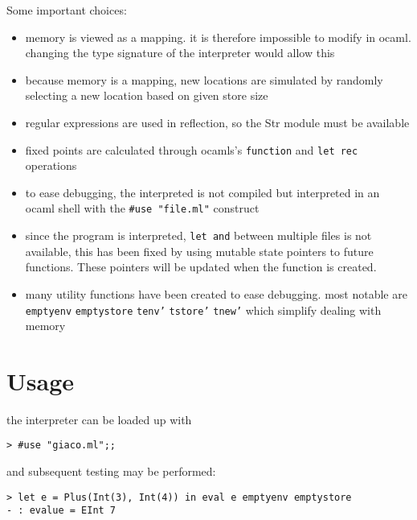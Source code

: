\documentclass[11pt]{report}
\begin{document}
Some important choices:
\begin{itemize}
\item memory is viewed as a mapping. it is therefore impossible to modify in ocaml. changing the type signature of the interpreter would allow this
\item because memory is a mapping, new locations are simulated by randomly selecting a new location based on given store size
\item regular expressions are used in reflection, so the Str module must be available
\item fixed points are calculated through ocamls's \texttt{function} and \texttt{let rec} operations
\item to ease debugging, the interpreted is not compiled but interpreted in an ocaml shell with the \texttt{\#use "file.ml"} construct
\item since the program is interpreted, \texttt{let and} between multiple files is not available, this has been fixed by using mutable state pointers to future functions. These pointers will be updated
when the function is created.
\item many utility functions have been created to ease debugging. most notable are \texttt{emptyenv} \texttt{emptystore} \texttt{tenv'} \texttt{tstore'} \texttt{tnew'} which simplify dealing with memory
\end{itemize}
\part{Usage}
\label{sec:org9296b6f}
the interpreter can be loaded up with
\begin{verbatim}
> #use "giaco.ml";;
\end{verbatim}

and subsequent testing may be performed:
\begin{verbatim}
> let e = Plus(Int(3), Int(4)) in eval e emptyenv emptystore
- : evalue = EInt 7
\end{verbatim}
\end{document}
